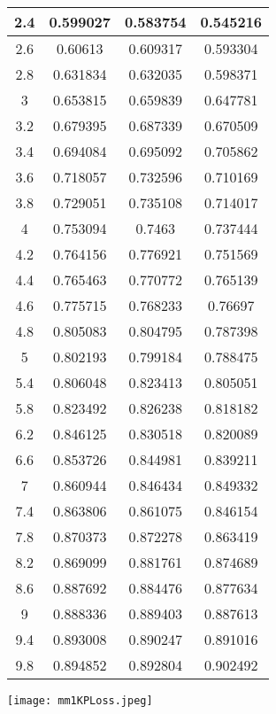 \documentclass{article}
\begin{document}
\begin{enumerate}
\begin{center}
\begin{tabular}{||c c c c||}
        2.4 & 0.599027 & 0.583754 & 0.545216 \\
        \hline
        2.6 & 0.60613 & 0.609317 & 0.593304 \\
        \hline
        2.8 & 0.631834 & 0.632035 & 0.598371 \\
        \hline
        3 & 0.653815 & 0.659839 & 0.647781 \\
        \hline
        3.2 & 0.679395 & 0.687339 & 0.670509 \\
        \hline
        3.4 & 0.694084 & 0.695092 & 0.705862 \\
        \hline
        3.6 & 0.718057 & 0.732596 & 0.710169 \\
        \hline
        3.8 & 0.729051 & 0.735108 & 0.714017 \\
        \hline
        4 & 0.753094 & 0.7463 & 0.737444 \\
        \hline
        4.2 & 0.764156 & 0.776921 & 0.751569 \\
        \hline
        4.4 & 0.765463 & 0.770772 & 0.765139 \\
        \hline
        4.6 & 0.775715 & 0.768233 & 0.76697 \\
        \hline
        4.8 & 0.805083 & 0.804795 & 0.787398 \\
        \hline
        5 & 0.802193 & 0.799184 & 0.788475 \\
        \hline
        5.4 & 0.806048 & 0.823413 & 0.805051 \\
        \hline
        5.8 & 0.823492 & 0.826238 & 0.818182 \\
        \hline
        6.2 & 0.846125 & 0.830518 & 0.820089 \\
        \hline
        6.6 & 0.853726 & 0.844981 & 0.839211 \\
        \hline
        7 & 0.860944 & 0.846434 & 0.849332 \\
        \hline
        7.4 & 0.863806 & 0.861075 & 0.846154 \\
        \hline
        7.8 & 0.870373 & 0.872278 & 0.863419 \\
        \hline
        8.2 & 0.869099 & 0.881761 & 0.874689 \\
        \hline
        8.6 & 0.887692 & 0.884476 & 0.877634 \\
        \hline
        9 & 0.888336 & 0.889403 & 0.887613 \\
        \hline
        9.4 & 0.893008 & 0.890247 & 0.891016 \\
        \hline
        9.8 & 0.894852 & 0.892804 & 0.902492 \\
        \hline
        \end{tabular}
    \end{center}
    \texttt{[image: mm1KPLoss.jpeg]}
\end{enumerate}
\end{document}
